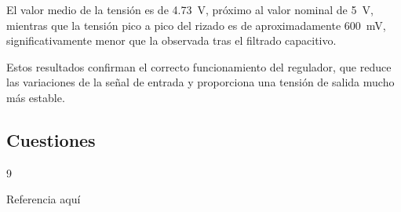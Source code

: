 \documentclass[a4paper,12pt]{article}
\begin{document}
El valor medio de la tensión es de \SI{4,73}{\volt}, próximo al valor nominal de \SI{5}{\volt}, mientras que la tensión pico a pico del rizado es de aproximadamente \SI{600}{\milli\volt}, significativamente menor que la observada tras el filtrado capacitivo.

Estos resultados confirman el correcto funcionamiento del regulador, que reduce las variaciones de la señal de entrada y proporciona una tensión de salida mucho más estable.
\subsection{Cuestiones}

\begin{thebibliography}{9}

Referencia aquí

\end{thebibliography}
\end{document}
